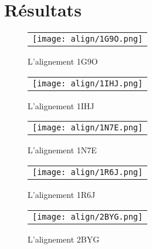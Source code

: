 \section{Résultats} 



    \clearpage

   \begin{figure}[t]
     \centering
     \begin{tabular}{c}
       \texttt{[image: align/1G9O.png]} \\
     \end{tabular}
     \caption{L'alignement 1G9O }
\label{graph:convEref}
   \end{figure}

    \clearpage

   \begin{figure}[t]
     \centering
     \begin{tabular}{c}
       \texttt{[image: align/1IHJ.png]} \\
     \end{tabular}
     \caption{L'alignement 1IHJ }
\label{graph:convEref}
   \end{figure}

    \clearpage

   \begin{figure}[t]
     \centering
     \begin{tabular}{c}
       \texttt{[image: align/1N7E.png]} \\
     \end{tabular}
     \caption{L'alignement 1N7E }
\label{graph:convEref}
   \end{figure}

    \clearpage

   \begin{figure}[t]
     \centering
     \begin{tabular}{c}
       \texttt{[image: align/1R6J.png]} \\
     \end{tabular}
     \caption{L'alignement 1R6J }
\label{graph:convEref}
   \end{figure}

    \clearpage

   \begin{figure}[t]
     \centering
     \begin{tabular}{c}
       \texttt{[image: align/2BYG.png]} \\
     \end{tabular}
     \caption{L'alignement 2BYG }
\label{graph:convEref}
   \end{figure}

